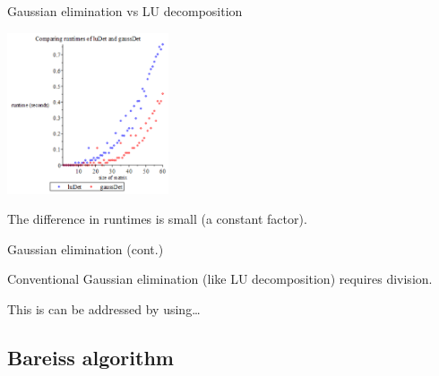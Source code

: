 \documentclass{beamer}
\begin{document}
\begin{frame}{Gaussian elimination vs LU decomposition}

    \begin{center}{}
        \includegraphics[height=180]{lu-gauss}
    \end{center}

    The difference in runtimes is small (a constant factor).

\end{frame}

\begin{frame}{Gaussian elimination (cont.)}

    Conventional Gaussian elimination (like LU decomposition) requires division.

    \pause{}

    This is can be addressed by using\dots

\end{frame}

\subsection{Bareiss algorithm}
\end{document}
